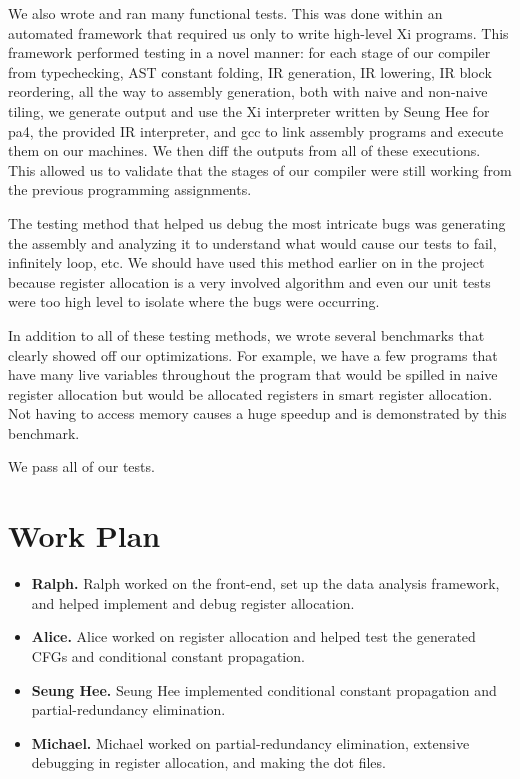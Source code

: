 \documentclass{hw}
\begin{document}
We also wrote and ran many functional tests. This was done within
an automated framework that required us only to write high-level Xi programs. This
framework performed testing in a novel manner: for each stage of our compiler from
typechecking, AST constant folding, IR generation, IR lowering, IR block reordering,
all the way to assembly generation, both with naive and non-naive tiling, we generate
output and use the Xi interpreter written by Seung Hee for pa4,
the provided IR interpreter, and gcc to link assembly programs and execute them on our
machines. We then diff the outputs from all of these executions. This allowed us to validate that the stages of our compiler were still working from the previous programming assignments.

The testing method that helped us debug the most intricate bugs was generating the assembly and analyzing it to understand what would cause our tests to fail, infinitely loop, etc. We should have used this method earlier on in the project because register allocation is a very involved algorithm and even our unit tests were too high level to isolate where the bugs were occurring.

In addition to all of these testing methods, we wrote several benchmarks that clearly showed off our optimizations. For example, we have a few programs that have many live variables throughout the program that would be spilled in naive register allocation but would be allocated registers in smart register allocation. Not having to access memory causes a huge speedup and is demonstrated by this benchmark.

We pass all of our tests.
\section{Work Plan}\label{sec:workplan}
\begin{itemize}
  \item \textbf{Ralph.}
    Ralph worked on the front-end, set up the data analysis framework, and helped implement and debug register allocation.

  \item \textbf{Alice.}
    Alice worked on register allocation and helped test the generated CFGs and conditional constant propagation.

  \item \textbf{Seung Hee.}
    Seung Hee implemented conditional constant propagation and partial-redundancy elimination.

  \item \textbf{Michael.}
    Michael worked on partial-redundancy elimination, extensive debugging in register allocation, and making the dot files.
\end{itemize}
\end{document}
